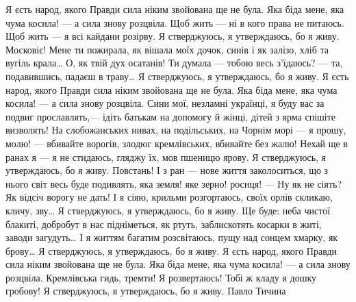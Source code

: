 Я єсть народ, якого Правди сила
ніким звойована ще не була.
Яка біда мене, яка чума косила! —
а сила знову розцвіла.
Щоб жить — ні в кого права не питаюсь.
Щоб жить — я всі кайдани розірву.
Я стверджуюсь, я утверждаюсь,
бо я живу.
Московіє! Мене ти пожирала,
як вішала моїх дочок, синів
і як залізо, хліб та вугіль крала…
О, як твій дух осатанів!
Ти думала — тобою весь з'їдаюсь? —
та, подавившись, падаєш в траву…
Я стверджуюсь, я утверждаюсь,
бо я живу.
Я єсть народ, якого Правди сила
ніким звойована ще не була.
Яка біда мене, яка чума косила! —
а сила знову розцвіла.
Сини мої, незламні українці,
я буду вас за подвиг прославлять,—
ідіть батькам на допомогу й жінці,
дітей з ярма спішіте визволять!
На слобожанських нивах, на подільських,
на Чорнім морі — я прошу, молю! —
вбивайте ворогів, злодюг кремлівських,
вбивайте без жалю!
Нехай ще в ранах я — я не стидаюсь,
гляджу їх, мов пшеницю ярову.
Я стверджуюсь, я утверждаюсь,
бо я живу.
Повстань! І з ран — нове життя заколоситься,
що з нього світ весь буде подивлять,
яка земля! яке зерно! росиця! —
Ну як не сіять? Як відсіч ворогу не дать!
І я сіяю, крильми розгортаюсь,
своїх орлів скликаю, кличу, зву…
Я стверджуюсь, я утверждаюсь,
бо я живу.
Ще буде: неба чистої блакиті,
добробут в нас підніметься, як ртуть,
заблискотять косарки в житі,
заводи загудуть…
І я життям багатим розсвітаюсь,
пущу над сонцем хмарку, як брову…
Я стверджуюсь, я утверждаюсь,
бо я живу.
Я єсть народ, якого Правди сила
ніким звойована ще не була.
Яка біда мене, яка чума косила! —
а сила знову розцвіла.
Кремлівська гидь, тремти! Я розвертаюсь!
Тобі ж кладу я дошку гробову!
Я стверджуюсь, я утверждаюсь,
бо я живу.
Павло Тичина


